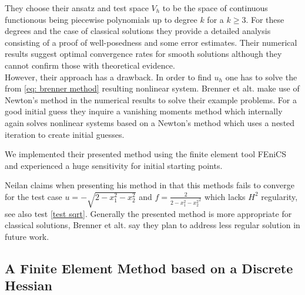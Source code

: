 They choose their ansatz and test space $V_h$ to be the space of continuous functionous being piecewise polynomials up to degree $k$ for a $k \geq 3$. For these degrees and the case of classical solutions they provide a detailed analysis consisting of a proof of well-posedness and some error estimates. Their numerical results suggest optimal convergence rates  for smooth solutions although they cannot confirm those with theoretical evidence. \\
However, their approach has a drawback. In order to find $u_h$ one has to solve the from \eqref{eq: brenner method} resulting nonlinear system. Brenner et alt. make use of Newton's method in the numerical results to solve their example problems. For a good initial guess they inquire a vanishing moments method which internally again solves nonlinear systems based on a Newton's method which uses a nested iteration to create initial guesses. 

We implemented their presented method using the finite element tool FEniCS \cite{FEniCS} and experienced a huge sensitivity for initial starting points. 

Neilan claims when presenting his method in \cite{Neilan2014} that this methods fails to converge for the test case
$u = -\sqrt{2 - x_1^2 - x_2^2 }$ and $f = \frac 2 {{2 - x_1^2 - x_2^2}^2}$ which lacks $H^2$ regularity, see also test \ref{test sqrt}. Generally the presented method is more appropriate for classical solutions, Brenner et alt. say they plan to address less regular solution in future work.


\subsection{A Finite Element Method based on a Discrete Hessian} \label{subsec: disrete Hessian} \label{sec: FEM discrete Hessian}

